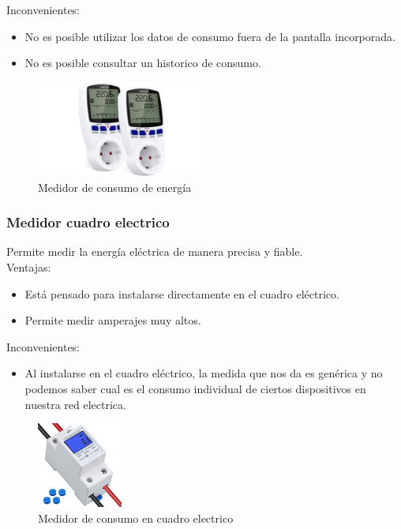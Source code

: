 \begin{titlepage}
Inconvenientes:
\begin{itemize}
	\item No es posible utilizar los datos de consumo fuera de la pantalla incorporada.
	\item No es posible consultar un historico de consumo.
\end{itemize}
\begin{figure}[h!]
	\centering
	\includegraphics[width=0.5\textwidth]{imagenes/medidor_consumo.jpg}
	\caption{Medidor de consumo de energía\cite{medidor_img}}
\end{figure}

\subsubsection{Medidor cuadro electrico}
Permite medir la energía eléctrica de manera precisa y fiable.\\

Ventajas:
\begin{itemize}
	\item Está pensado para instalarse directamente en el cuadro eléctrico.
	\item Permite medir amperajes muy altos.
\end{itemize}

Inconvenientes:
\begin{itemize}
	\item Al instalarse en el cuadro eléctrico, la medida que nos da es genérica y no podemos saber cual es el consumo individual de ciertos dispositivos en nuestra red electrica. 
\end{itemize}
\begin{figure}[h!]
	\centering
	\includegraphics[width=0.25\textwidth]{imagenes/medidor_cuadro.jpg}
	\caption{Medidor de consumo en cuadro electrico\cite{medidor_cuadro_img}}
\end{figure}


\end{titlepage}
